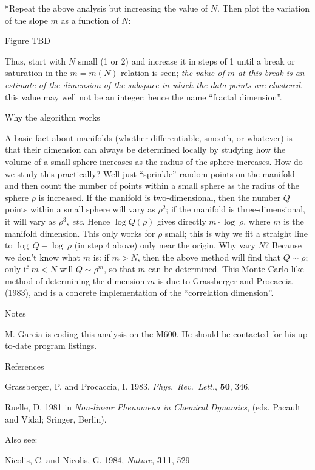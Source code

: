 \**Repeat the above analysis but increasing the value of $N$.  Then
plot the variation of the slope $m$ as a function of $N$:

\vskip 1.5in
\centerline{Figure TBD}
\vskip 1.5in

{\list

Thus, start with $N$ small (1 or 2) and increase it in
steps of 1 until a break or saturation in the $m=m(N)$ relation is
seen; {\it the value of $m$ at this break is an estimate of the
dimension of the subspace in which the data points are clustered}.
this value may well not be an integer; hence the name ``fractal
dimension''.

}

\@{Why the algorithm works}

A basic fact about manifolds (whether differentiable, smooth, or
whatever) is that their dimension can always be determined locally by
studying how the volume of a small sphere increases as the radius of
the sphere increases.  How do we study this practically?  Well just
``sprinkle'' random points on the manifold and then count the number
of points within a small sphere as the radius of the sphere $\rho$ is
increased.  If the manifold is two-dimensional, then the number $Q$
points within a small sphere will vary as $\rho^{2}$; if the manifold
is three-dimensional, it will vary as $\rho^{3}$, {\it etc}.  Hence $\log
Q(\rho)$ gives directly $m\cdot \log~\rho$, where $m$ is the manifold
dimension.  This only works for $\rho$ small; this is why we fit a
straight line to $\log~Q - \log~\rho$ (in step 4 above) only near the
origin.  Why vary $N$? Because we don't know what $m$ is: if $m > N$,
then the above method will find that $Q\sim \rho$; only if $m<N$ will
$Q\sim \rho^m$, so that $m$ can be determined.  This
Monte-Carlo-like method of determining the dimension $m$ is due to
Grassberger and Procaccia (1983), and is a concrete implementation of
the ``correlation dimension''.

\@{Notes}

M. Garcia is coding this analysis on the M600.  He should be contacted
for his up-to-date program listings.

\@{References}

Grassberger, P. and Procaccia, I. 1983, {\it Phys.~Rev.~Lett.}, {\bf 50},
346.

Ruelle, D. 1981 in {\it Non-linear Phenomena in Chemical Dynamics},
(eds. Pacault and Vidal;  Sringer, Berlin).

\noindent
Also see:

Nicolis, C. and Nicolis, G. 1984, {\it Nature}, {\bf 311}, 529

\vfill\eject

